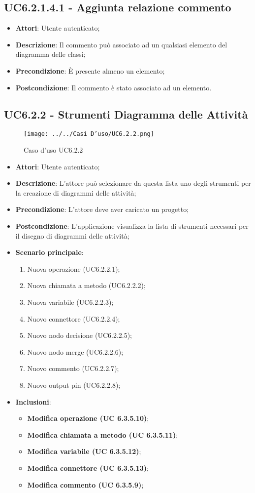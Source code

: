 \subsection{UC6.2.1.4.1 - Aggiunta relazione commento} 
\label{ssec:UC6.2.1.4.1} 
\begin{itemize} 
\item \textbf{Attori}: Utente autenticato;
\item \textbf{Descrizione}: Il commento può associato ad un qualsiasi elemento del diagramma delle classi;
\item \textbf{Precondizione}: È presente almeno un elemento;
\item \textbf{Postcondizione}: Il commento è stato associato ad un elemento.
\end{itemize} 
\subsection{UC6.2.2 - Strumenti Diagramma delle Attività} 
\label{ssec:UC6.2.2} 
\begin{figure}[H] 
\centering 
\texttt{[image: ../../Casi D'uso/UC6.2.2.png]} 
\caption{Caso d'uso UC6.2.2} 
 \end{figure} 
\begin{itemize} 
\item \textbf{Attori}: Utente autenticato;
\item \textbf{Descrizione}: L'attore può selezionare da questa lista uno degli strumenti per la creazione di diagrammi delle attività;
\item \textbf{Precondizione}: L'attore deve aver caricato un progetto;
\item \textbf{Postcondizione}: L'applicazione visualizza la lista di strumenti necessari per il disegno di diagrammi delle attività;
\item \textbf{Scenario principale}: \begin{enumerate}\item Nuova operazione (UC6.2.2.1);\item Nuova chiamata a metodo (UC6.2.2.2);\item Nuova variabile (UC6.2.2.3);\item Nuovo connettore (UC6.2.2.4);\item Nuovo nodo decisione (UC6.2.2.5);\item Nuovo nodo merge (UC6.2.2.6);\item Nuovo commento (UC6.2.2.7);\item Nuovo output pin (UC6.2.2.8);
 \end{enumerate}
 \item \textbf{Inclusioni}: \begin{itemize}
 \item \textbf{ Modifica operazione (UC 6.3.5.10)};
 \item \textbf{ Modifica chiamata a metodo (UC 6.3.5.11)};
 \item \textbf{ Modifica variabile (UC 6.3.5.12)};
  \item \textbf{ Modifica connettore (UC 6.3.5.13)};
  \item \textbf{ Modifica commento (UC 6.3.5.9)};
 \end{itemize}
 
\end{itemize} 
